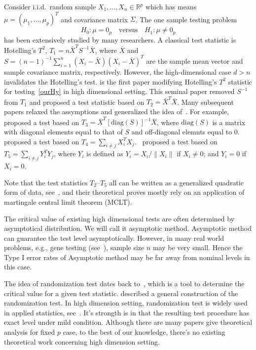 \documentclass[review]{elsarticle}
\theoremstyle{plain}
\theoremstyle{definition}
\theoremstyle{remark}
\begin{document}
Consider i.i.d.\ random sample $X_{1},\ldots,X_{n}\in \mathbb{R}^p$ which has means $\mu={(\mu_1,\ldots,\mu_p)}^T$ and covariance matrix $\Sigma$. The one sample testing problem
\begin{equation}\label{ourHy}
    H_0:\mu=0_p\quad \textrm{versus} \quad H_1:\mu\neq 0_p
\end{equation}
has been extensively studied by many researchers.
A classical test statistic is Hotelling's $T^2$, 
    $
    T_{1}=n\bar{X}^T S^{-1}\bar{X}
    $,
where $\bar{X}$ and $S=(n-1)^{-1}\sum_{i=1}^n (X_i-\bar{X}) (X_i-\bar{X})^T$ are the sample mean vector and sample covariance matrix, respectively.
However, the high-dimensional case $d>n$ invalidates the Hotelling's test.
\cite{Bai1996Efiect} is the first paper modifying Hotelling's $T^2$ statistic for testing~\eqref{ourHy} in high dimensional setting.
This seminal paper removed $S^{-1}$ from $T_1$ and proposed a test statistic based on
$
T_2=\bar{X}^T\bar{X}
$.
Many subsequent papers relaxed the assymptions and generalized the idea of~\cite{Bai1996Efiect}.
For example,~\cite{Srivastava2009A} proposed a test based on
$
T_3=\bar{X}^T {[\mathrm{diag}(S)]}^{-1} \bar{X}
$,
where $\mathrm{diag}(S)$ is a matrix with diagonal elements equal to that of $S$ and off-diagonal elemnts equal to $0$.
\cite{Chen2010A} proposed a test based on
$
T_4=\sum_{i\neq j}X_i^T X_j
$.~\cite{Wang2015A} proposed a test based on $T_5=\sum_{i\neq j}Y_i^T Y_j$, where $Y_i$ is defined as $Y_i=X_i/\|X_i\|$ if $X_i\neq 0$; and $Y_i=0$ if $X_i=0$.

Note that the test statistics $T_2$--$T_5$ all can be written as a generalized quadratic form of data, see~\cite{Jong1987A}, and their theoretical proves mostly rely on an application of martingale central limit theorem (MCLT).

The critical value of existing high dimensional tests are often determined by asymptotical distribution. 
We will call it asymptotic method.
Asymptotic method can guarantee the test level asymptotically.
However, in many real world problems, e.g., gene testing (see~\cite{efron2007on}), sample size $n$ may be very small.
Hence the Type I error rates of Asymptotic method may be far away from nominal levels in this case. 


The idea of randomization test dates back to~\cite{Fisher}, which is a tool to determine the critical value for a given test statistic.
\cite{Romano1990On} described a general construction of the randomization test.
In high dimension setting, randomization test is widely used in applied statistics, see~\cite{efron2007on}.
It's strongth is in that the resulting test procedure has exact level under mild condition.
Although there are many papers give theoretical analysis for fixed $p$ case,
to the best of our knowledge, there's no existing theoretical work concerning high dimension setting.
\end{document}
